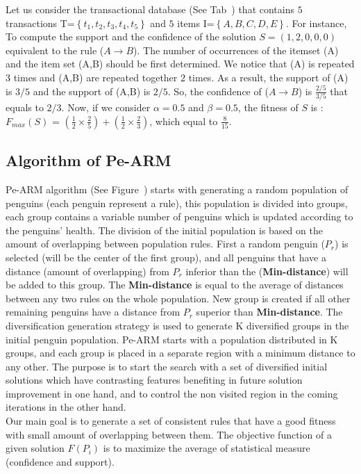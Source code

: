 \documentclass[preprint,12pt]{elsarticle}
\begin{document}
Let us consider the transactional database (See
Tab~\cite{TransacionalDatabaseIllustration}) that contains $5$
transactions T=$\left\{t_{1}, t_{2}, t_{3}, t_{4}, t_{5}\right\}$ and
$5$ items I=$\left\{A, B, C, D, E \right\}$. For instance, To compute the support
and the confidence of the solution $S=(1,2,0,0,0)$ equivalent to the
rule ($A \rightarrow B$). The number of occurrences of the itemset
(A) and the item set (A,B) should be first determined. We notice that
(A) is repeated $3$ times and (A,B) are repeated together $2$ times.
As a result, the support of (A) is $3/5$ and the support of
(A,B) is $2/5$. So, the confidence of ($A \rightarrow B$) is
$\frac{2/5}{3/5}$ that equals to $2/3$. Now, if we consider
$\alpha=0.5$ and $\beta=0.5$, the fitness of $S$ is :
$F_{max}(S)$ =  ${\left(\frac{1}{2} \times \frac{2}{5}\right)} + {\left(\frac{1}{2} \times
\frac{2}{3}\right)}$, which equal to $\frac{8}{15}$.

\subsection{Algorithm of Pe-ARM}
Pe-ARM algorithm (See Figure~\cite{algo}) starts with generating a random population of penguins (each penguin represent a rule), this population is divided into groups, each group contains a variable number of penguins which is updated according to the penguins' health. The division of the initial population is based on the amount of overlapping between population rules. 
First a random penguin ($P_{r}$) is selected (will be the center of the first group), and all penguins that have a distance (amount of overlapping) from $P_{r}$ inferior than the (\textbf{Min-distance}) will be added to this group. The \textbf{Min-distance} is equal to the average of distances between any two rules on the whole population. New group is created if all other remaining penguins have a distance  from $P_{r}$ superior than \textbf{Min-distance}.
The diversification generation strategy is used to generate K diversified groups in the initial penguin population. Pe-ARM starts with a population distributed in K groups, and each group is placed in a separate region with a minimum distance to any other. The purpose is to start the search with a set of diversified initial solutions which have contrasting features benefiting in future solution improvement in one hand, and to control the non visited region in the coming iterations in the other hand.\\  
 Our main goal is to generate a set of consistent rules that have a good fitness with small amount of overlapping between them. The objective function of a given solution $F(P_{i})$ is to maximize the average of statistical measure (confidence and support).
 
\end{document}
